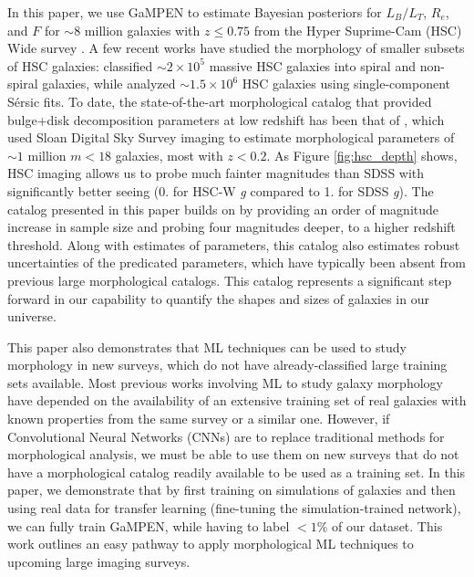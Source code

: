 \documentclass[linenumbers,twocolumn,twocolappendix]{aastex631}
\newcommand\sersic{S\'ersic}
\newcommand\gampen{GaMPEN}
\newcommand\gb{\textit{g}}
\begin{document}
\begin{CJK*}{UTF8}{gbsn}
In this paper, we use \gampen{} to estimate Bayesian posteriors for $L_B/L_T$, $R_e$, and $F$ for $\sim 8$ million galaxies with $z \leq 0.75$ from the Hyper Suprime-Cam (HSC) Wide survey \citep{hsc_design}. A few recent works have studied the morphology of smaller subsets of HSC galaxies: \citet{shimakawa_2021} classified $\sim2\times10^5$ massive HSC galaxies into spiral and non-spiral galaxies, while \citet{hsc_sersic} analyzed $\sim1.5\times10^6$ HSC galaxies using single-component \sersic{} fits. To date, the state-of-the-art morphological catalog that provided bulge+disk decomposition parameters at low redshift has been that of \citet{simard_11}, which used Sloan Digital Sky Survey \citep[SDSS; ][]{sdss_tech_summary} imaging to estimate morphological parameters of $\sim1$ million $m < 18$ galaxies, most with $z < 0.2$. As Figure \ref{fig:hsc_depth} shows, HSC imaging allows us to probe much fainter magnitudes than SDSS with significantly better seeing (0. for HSC-W \gb{} compared to 1. for SDSS \gb{}). The catalog presented in this paper builds on \citet{simard_11} by providing an order of magnitude increase in sample size and probing four magnitudes deeper, to a higher redshift threshold. Along with estimates of parameters, this catalog also estimates robust uncertainties of the predicated parameters, which have typically been absent from previous large morphological catalogs. This catalog represents a significant step forward in our capability to quantify the shapes and sizes of galaxies in our universe. 


This paper also demonstrates that ML techniques can be used to study morphology in new surveys, which do not have already-classified large training sets available. Most previous works involving ML to study galaxy morphology have depended on the availability of an extensive training set of real galaxies with known properties from the same survey or a similar one. However, if Convolutional Neural Networks (CNNs) are to replace traditional methods for morphological analysis, we must be able to use them on new surveys that do not have a morphological catalog readily available to be used as a training set. In this paper, we demonstrate that by first training on simulations of galaxies and then using real data for transfer learning (fine-tuning the simulation-trained network), we can fully train \gampen{}, while having to label $<1\%$ of our dataset. This work outlines an easy pathway to apply morphological ML techniques to upcoming large imaging surveys.  


\end{CJK*}
\end{document}
